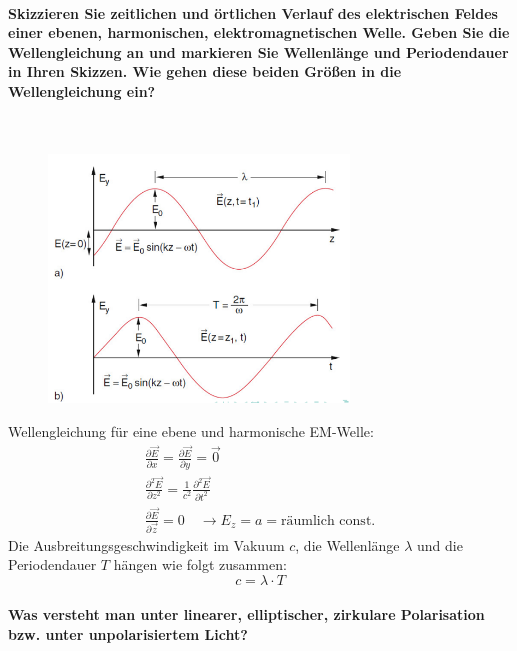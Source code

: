 \documentclass[a4paper, 11pt, ngerman, parskip=half]{scrartcl}
\begin{document}
\paragraph{Skizzieren Sie zeitlichen und örtlichen Verlauf des elektrischen Feldes einer ebenen,
harmonischen, elektromagnetischen Welle. Geben Sie die Wellengleichung an und markieren Sie
Wellenlänge und Periodendauer in Ihren Skizzen. Wie gehen diese beiden Größen in die Wellengleichung
ein?} ~

\begin{figure}[H]
    \centering
    \includegraphics[width=8cm]{image/13/2.png}
\end{figure}
Wellengleichung für eine ebene und harmonische EM-Welle:
\begin{equation}
    \begin{split}
        \frac{\partial \vec{E}}{\partial x} = \frac{\partial \vec{E}}{\partial y} = \vec{0} \\
        \frac{\partial^2 \vec{E}}{\partial z^2} = \frac{1}{c^2} \frac{\partial^2 \vec{E}}{\partial t^2} \\
        \frac{\partial \vec{E}}{\partial \vec{z}} = 0 \quad \rightarrow E_z = a = \text{räumlich const.}
    \end{split}  
\end{equation}
Die Ausbreitungsgeschwindigkeit im Vakuum $c$, die Wellenlänge $\lambda$ und die Periodendauer $T$ hängen wie folgt zusammen:
\begin{equation}
    c = \lambda \cdot T
\end{equation}
\paragraph{Was versteht man unter linearer, elliptischer, zirkulare Polarisation bzw. unter
unpolarisiertem Licht?} ~
\end{document}
